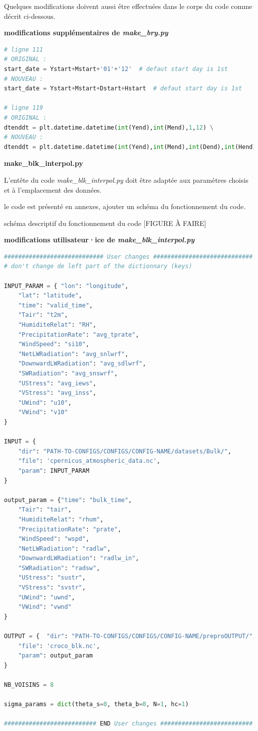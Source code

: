 \documentclass[10pt,a4paper,titlepage]{article}
\begin{document}
Quelques modifications doivent aussi être effectuées dans le corps du code comme décrit ci-dessous.

\begin{codeEnv}{\textbf{modifications supplémentaires de \textit{make\_bry.py}}}
\begin{lstlisting}[language=python]
# ligne 111
# ORIGINAL :
start_date = Ystart+Mstart+'01'+'12'  # defaut start day is 1st
# NOUVEAU :
start_date = Ystart+Mstart+Dstart+Hstart  # defaut start day is 1st

# ligne 119
# ORIGINAL :
dtenddt = plt.datetime.datetime(int(Yend),int(Mend),1,12) \
# NOUVEAU :
dtenddt = plt.datetime.datetime(int(Yend),int(Mend),int(Dend),int(Hend)) \
\end{lstlisting}
\end{codeEnv}


\textbf{make\_blk\_interpol.py}

L'entête du code \textit{make\_blk\_interpol.py} doit être adaptée aux paramètres choisis et à l'emplacement des données.

le code est présenté en annexes, ajouter un schéma du fonctionnement du code.

schéma descriptif du fonctionnement du code [FIGURE À FAIRE]

\begin{codeEnv}{\textbf{modifications utilisateur·ice de \textit{make\_blk\_interpol.py}}}
\begin{lstlisting}[language=python]
############################ User changes ############################
# don't change de left part of the dictionnary (keys)

INPUT_PARAM = {	"lon": "longitude",
    "lat": "latitude",
    "time": "valid_time",
    "Tair": "t2m",
    "HumiditeRelat": "RH",
    "PrecipitationRate": "avg_tprate",
    "WindSpeed": "si10",
    "NetLWRadiation": "avg_snlwrf",
    "DownwardLWRadiation": "avg_sdlwrf",
    "SWRadiation": "avg_snswrf",
    "UStress": "avg_iews",
    "VStress": "avg_inss",
    "UWind": "u10",
    "VWind": "v10"
}

INPUT = {
    "dir": "PATH-TO-CONFIGS/CONFIGS/CONFIG-NAME/datasets/Bulk/",
    "file": 'cpernicus_atmospheric_data.nc',
    "param": INPUT_PARAM
}

output_param = {"time": "bulk_time",
    "Tair": "tair",
    "HumiditeRelat": "rhum",
    "PrecipitationRate": "prate",
    "WindSpeed": "wspd",
    "NetLWRadiation": "radlw",
    "DownwardLWRadiation": "radlw_in",
    "SWRadiation": "radsw",
    "UStress": "sustr",
    "VStress": "svstr",
    "UWind": "uwnd",
    "VWind": "vwnd"
}

OUTPUT = {	"dir": "PATH-TO-CONFIGS/CONFIGS/CONFIG-NAME/preproOUTPUT/",
    "file": 'croco_blk.nc',
    "param": output_param
}

NB_VOISINS = 8

sigma_params = dict(theta_s=0, theta_b=0, N=1, hc=1)

########################## END User changes ##########################
\end{lstlisting}
\end{codeEnv}
\end{document}
